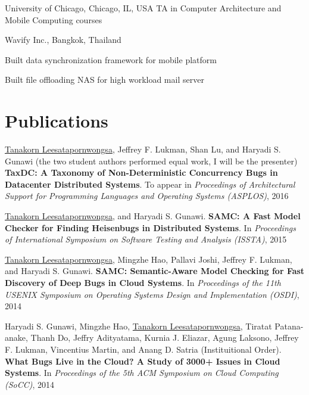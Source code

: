 \documentclass[10pt]{article} %
\begin{document}
{University of Chicago, Chicago, IL, USA}
{TA in Computer Architecture and Mobile Computing courses} 

{Wavify Inc., Bangkok, Thailand}
{\begin{minipage}{\smallertextwidth}
\begin{itemize-noindent}
\setlength\itemsep{-1ex}
\item Built data synchronization framework for mobile platform
\item Built file offloading NAS for high workload mail server
\end{itemize-noindent}
\end{minipage}}


\section{Publications}
\underline{Tanakorn Leesatapornwongsa}, Jeffrey F. Lukman, Shan Lu, and Haryadi
S. Gunawi (the two student authors performed equal work, I will be the
presenter) \textbf{TaxDC: A Taxonomy of Non-Deterministic Concurrency Bugs in
Datacenter Distributed Systems}. To appear in \textit{Proceedings of
Architectural Support for Programming Languages and Operating Systems
(ASPLOS)}, 2016 
\vspace{2mm}

\underline{Tanakorn Leesatapornwongsa}, and Haryadi S. Gunawi. \textbf{SAMC: A
Fast Model Checker for Finding Heisenbugs in Distributed Systems}. In
\textit{Proceedings of International Symposium on Software Testing and Analysis
(ISSTA)}, 2015
\vspace{2mm}

\underline{Tanakorn Leesatapornwongsa}, Mingzhe Hao, Pallavi Joshi, Jeffrey F.
Lukman, and Haryadi S. Gunawi. \textbf{SAMC: Semantic-Aware Model Checking for
Fast Discovery of Deep Bugs in Cloud Systems}. In \textit{Proceedings of the
11th USENIX Symposium on Operating Systems Design and Implementation (OSDI)},
2014
\vspace{2mm}

\newpage
Haryadi S. Gunawi, Mingzhe Hao, \underline{Tanakorn Leesatapornwongsa}, Tiratat
Patana-anake, Thanh Do, Jeffry Adityatama, Kurnia J. Eliazar, Agung Laksono,
Jeffrey F. Lukman, Vincentius Martin, and Anang D. Satria (Instituitional Order).
\textbf{What Bugs Live in the Cloud? A Study of 3000+ Issues in Cloud Systems}.
In \textit{Proceedings of the 5th ACM Symposium on Cloud Computing (SoCC)}, 2014
\vspace{2mm}
\end{document}
